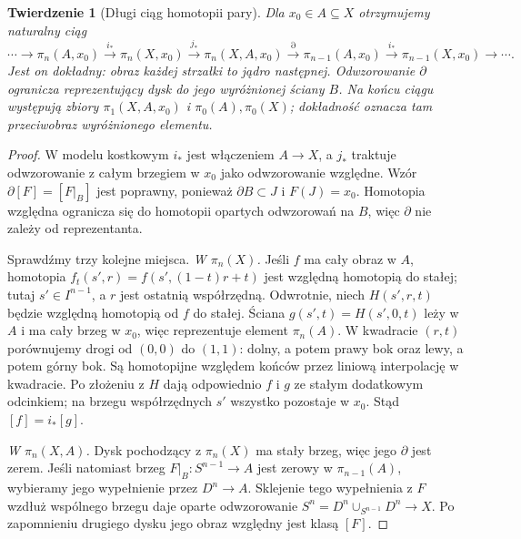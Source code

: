 \documentclass[11pt,a4paper,oneside]{report}
\theoremstyle{plain}
\newtheorem{twierdzenie}{Twierdzenie}[section]
\theoremstyle{definition}
\theoremstyle{remark}
\begin{document}
\begin{twierdzenie}[Długi ciąg homotopii pary]
\label{thm:les-pi}
Dla $x_0\in A\subseteq X$ otrzymujemy
naturalny ciąg
\begin{equation}\label{eq:les-pi}
 \cdots\to\pi_n(A,x_0)\xrightarrow{i_*}
 \pi_n(X,x_0)\xrightarrow{j_*}
 \pi_n(X,A,x_0)\xrightarrow{\partial}
 \pi_{n-1}(A,x_0)\xrightarrow{i_*}
 \pi_{n-1}(X,x_0)\to\cdots .
\end{equation}
Jest on dokładny: obraz każdej
strzałki to jądro następnej.
Odwzorowanie $\partial$ ogranicza
reprezentujący dysk do jego
wyróżnionej ściany $B$.
Na końcu ciągu występują
zbiory $\pi_1(X,A,x_0)$ i
$\pi_0(A),\pi_0(X)$; dokładność
oznacza tam przeciwobraz
wyróżnionego elementu.
\end{twierdzenie}
\begin{proof}
W modelu kostkowym $i_*$ jest
włączeniem $A\to X$, a $j_*$
traktuje odwzorowanie z całym brzegiem
w $x_0$ jako odwzorowanie względne.
Wzór $\partial[F]=[F|_B]$
jest poprawny, ponieważ
$\partial B\subset J$ i
$F(J)=x_0$. Homotopia
względna ogranicza się
do homotopii opartych
odwzorowań na $B$, więc
$\partial$ nie zależy
od reprezentanta.

Sprawdźmy trzy kolejne miejsca.
\emph{W $\pi_n(X)$.} Jeśli $f$ ma cały obraz w $A$, homotopia
$f_t(s',r)=f(s',(1-t)r+t)$ jest względną homotopią do stałej;
tutaj $s'\in I^{n-1}$, a $r$ jest ostatnią współrzędną.
Odwrotnie, niech $H(s',r,t)$ będzie względną homotopią
od $f$ do stałej. Ściana $g(s',t)=H(s',0,t)$ leży w $A$
i ma cały brzeg w $x_0$, więc reprezentuje element $\pi_n(A)$.
W kwadracie $(r,t)$ porównujemy drogi od $(0,0)$ do $(1,1)$:
dolny, a potem prawy bok oraz lewy, a potem górny bok.
Są homotopijne względem końców przez liniową interpolację w kwadracie.
Po złożeniu z $H$ dają odpowiednio $f$ i $g$ ze stałym dodatkowym
odcinkiem; na brzegu współrzędnych $s'$ wszystko pozostaje w $x_0$.
Stąd $[f]=i_*[g]$.

\emph{W $\pi_n(X,A)$.} Dysk
pochodzący z $\pi_n(X)$
ma stały brzeg, więc jego
$\partial$ jest zerem.
Jeśli natomiast brzeg
$F|_B:S^{n-1}\to A$ jest
zerowy w $\pi_{n-1}(A)$,
wybieramy jego wypełnienie
przez $D^n\to A$. Sklejenie
tego wypełnienia z $F$
wzdłuż wspólnego brzegu
daje oparte odwzorowanie
$S^n=D^n\cup_{S^{n-1}}D^n\to X$.
Po zapomnieniu drugiego
dysku jego obraz względny
jest klasą $[F]$.


\end{proof}
\end{document}
